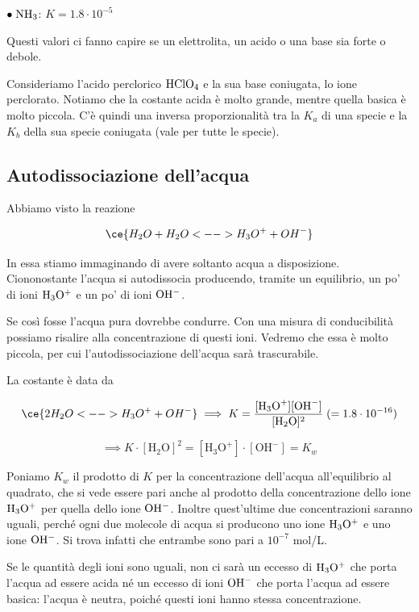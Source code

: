 \vspace{0.2cm}$\bullet \; \rm NH_3$: $K=1.8 \cdot 10^{-5}$

\vspace{0.4cm}Questi valori ci fanno capire se un elettrolita, un acido o una base sia forte o debole.

Consideriamo l'acido perclorico $\rm HClO_4$ e la sua base coniugata, lo ione perclorato. Notiamo che la costante acida è molto grande, mentre quella basica è molto piccola. C'è quindi una inversa proporzionalità tra la $K_a$ di una specie e la $K_b$ della sua specie coniugata (vale per tutte le specie).
\newpage
\subsection{Autodissociazione dell'acqua}
Abbiamo visto la reazione

$$\ce{H_2O + H_2O <--> H_3O^+ + OH^-}$$

In essa stiamo immaginando di avere soltanto acqua a disposizione. Ciononostante l'acqua si autodissocia producendo, tramite un equilibrio, un po' di ioni $\rm H_3O^+$ e un po' di ioni $\rm OH^-$.

Se così fosse l'acqua pura dovrebbe condurre. Con una misura di conducibilità possiamo risalire alla concentrazione di questi ioni. Vedremo che essa è molto piccola, per cui l'autodissociazione dell'acqua sarà trascurabile.

La costante è data da

$$\ce{2 H_2O <--> H_3O^+ + OH^-}
\implies
K= \frac{[\text{H}_3\text{O}^+] [\text{OH}^-]}{[\text{H}_2\text{O}]^2} \; (=1.8 \cdot 10^{-16})$$

$$\implies K \cdot [\text{H}_2\text{O}]^2 = [\text{H}_3\text{O}^+] \cdot [\text{OH}^-] = K_w$$

Poniamo $K_w$ il prodotto di $K$ per la concentrazione dell'acqua all'equilibrio al quadrato, che si vede essere pari anche al prodotto della concentrazione dello ione $\rm H_3O^+$ per quella dello ione $\rm OH^-$. Inoltre quest'ultime due concentrazioni saranno uguali, perché ogni due molecole di acqua si producono uno ione $\rm H_3O^+$ e uno ione $\rm OH^-$. Si trova infatti che entrambe sono pari a $10^{-7}$ mol/L.

Se le quantità degli ioni sono uguali, non ci sarà un eccesso di $\rm H_3O^+$ che porta l'acqua ad essere acida né un eccesso di ioni $\rm OH^-$ che porta l'acqua ad essere basica: l'acqua è neutra, poiché questi ioni hanno stessa concentrazione.


